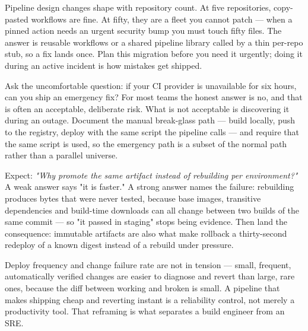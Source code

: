 \begin{scalenote}
Pipeline design changes shape with repository count. At five repositories, copy-pasted workflows are fine. At fifty, they are a fleet you cannot patch --- when a pinned action needs an urgent security bump you must touch fifty files. The answer is reusable workflows or a shared pipeline library called by a thin per-repo stub, so a fix lands once. Plan this migration before you need it urgently; doing it during an active incident is how mistakes get shipped.
\end{scalenote}

\begin{drtip}
Ask the uncomfortable question: if your CI provider is unavailable for six hours, can you ship an emergency fix? For most teams the honest answer is no, and that is often an acceptable, deliberate risk. What is not acceptable is discovering it during an outage. Document the manual break-glass path --- build locally, push to the registry, deploy with the same script the pipeline calls --- and require that the same script is used, so the emergency path is a subset of the normal path rather than a parallel universe.
\end{drtip}

\begin{interview}
Expect: \emph{"Why promote the same artifact instead of rebuilding per environment?"} A weak answer says "it is faster." A strong answer names the failure: rebuilding produces bytes that were never tested, because base images, transitive dependencies and build-time downloads can all change between two builds of the same commit --- so "it passed in staging" stops being evidence. Then land the consequence: immutable artifacts are also what make rollback a thirty-second redeploy of a known digest instead of a rebuild under pressure.
\end{interview}

\begin{reliability}
Deploy frequency and change failure rate are not in tension --- small, frequent, automatically verified changes are easier to diagnose and revert than large, rare ones, because the diff between working and broken is small. A pipeline that makes shipping cheap and reverting instant is a reliability control, not merely a productivity tool. That reframing is what separates a build engineer from an SRE.
\end{reliability}


